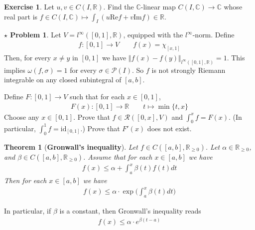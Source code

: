 \documentclass[12pt,b5paper,notitlepage]{article}
\theoremstyle{definition}
\newtheorem{exe}[df]{Exercise}
\newtheorem{sprob}[prob]{\color{red}$\star$ Problem}
\theoremstyle{plain}
\newtheorem{thm}[df]{Theorem}
\newcommand{\fk}{\mathfrak}
\newcommand{\mc}{\mathcal}
\newcommand{\id}{\mathrm{id}}
\newcommand{\scr}{\mathscr}
\newcommand{\Cbb}{\mathbb C}
\newcommand{\Rbb}{\mathbb R}
\newcommand{\Real}{\mathrm{Re}}
\newcommand{\Imag}{\mathrm{Im}}
\numberwithin{equation}{section}
\begin{document}
\begin{exe}
Let $u,v\in C(I,\Rbb)$. Find the $\Cbb$-linear map $C(I,\Cbb)\rightarrow\Cbb$ whose real part is $f\in C(I,\Cbb)\mapsto \int_I(u\Real f+v\Imag f)\in\Rbb$. 
\end{exe}



\begin{sprob}\label{lb389}
Let $V=l^\infty([0,1],\Rbb)$, equipped with the $l^\infty$-norm. Define 
\begin{align*}
f:[0,1]\rightarrow V\qquad f(x)=\chi_{[x,1]}
\end{align*}
Then, for every $x\neq y$ in $[0,1]$ we have $\Vert f(x)-f(y)\Vert_{l^\infty([0,1],\Rbb)}=1$. This implies $\omega(f,\sigma)=1$ for every $\sigma\in\mc P(I)$. So $f$ is not strongly Riemann integrable on any closed subintegral of $[a,b]$. 

Define $F:[0,1]\rightarrow V$ such that for each $x\in [0,1]$,
\begin{align*}
F(x):[0,1]\rightarrow\Rbb\qquad t\mapsto\min\{t,x\}
\end{align*}
Choose any $x\in[0,1]$. Prove that $f\in\scr R([0,x],V)$ and $\int_0^xf=F(x)$. (In particular, $\int_0^1f=\id_{[0,1]}$.) Prove that $F'(x)$ does not exist.  \hfill\qedsymbol
\end{sprob}

\begin{comment}
\begin{proof}[Hint]
To find $\int_0^1f$, for each $y\in\Rbb$, define $\varphi_y:V\rightarrow\Rbb$ by $\varphi_y(f)=f(y)$. Then $\varphi_y\in\fk L(V,\Rbb)$. Use $\varphi_y(\int_0^1f)=\int_0^1\varphi_y(f)$ to calculate $\int_0^1f$.
\end{proof}
\end{comment}






\begin{thm}[\textbf{Gronwall's inequality}] 
Let $f\in C([a,b],\Rbb_{\geq0})$. Let $\alpha\in\Rbb_{\geq0}$, and $\beta\in C([a,b],\Rbb_{\geq0})$. Assume that for each $x\in[a,b]$ we have
\begin{align}
f(x)\leq  \alpha+\int_a^x\beta(t)f(t) dt  \label{eq160}
\end{align}
Then for each $x\in[a,b]$ we have
\begin{align}
f(x)\leq \alpha\cdot  \exp\Big(\int_a^x \beta(t)dt \Big)
\end{align}
\end{thm}
In particular, if $\beta$ is a constant, then Gronwall's inequality reads
\begin{align*}
f(x)\leq\alpha\cdot e^{\beta (t-a)}
\end{align*}
\end{document}
